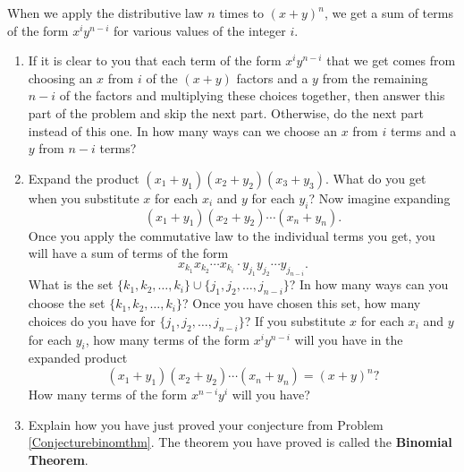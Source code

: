 \iteme  When we apply the distributive law $n$ times to $(x+y)^n$, we get a
sum of terms of the form $x^iy^{n-i}$ for various values of the integer $i$.  
\begin{enumerate}
\item If it is clear to you that each term of the form $x^iy^{n-i}$ that we
get comes from choosing an $x$ from $i$ of the $(x+y)$ factors and a $y$ from
the remaining
$n-i$ of the factors and multiplying these choices together, then answer this
part of the problem and skip the next part.  Otherwise, do the next part
instead of this one.  In how many ways can we choose an $x$ from $i$ terms
and a $y$ from
$n-i$ terms?
\item  Expand the product $(x_1 +y_1)(x_2 +y_2)(x_3+y_3)$.  What do you get
when you substitute $x$ for each $x_i$ and $y$ for each $y_i$?  Now imagine
expanding $$(x_1+y_1)(x_2+y_2)\cdots (x_n+y_n).$$  Once you apply the
commutative law to the individual terms you get, you will have a sum of terms
of the form $$x_{k_1}x_{k_2}\cdots x_{k_i}\cdot y_{j_1}y_{j_2}\cdots
y_{j_{n-i}}.$$
What is the set $\{k_1,k_2,\ldots, k_i\}\cup \{j_1,j_2,\ldots, j_{n-i}\}$?  In
how many ways can you choose the set  $\{k_1,k_2,\ldots, k_i\}$?  Once you
have chosen this set, how many choices do you have for $\{j_1,j_2,\ldots,
j_{n-i}\}$?  If you substitute $x$ for each $x_i$ and $y$ for each $y_i$, how
many terms of the form $x^iy^{n-i}$ will you have in the expanded product
$$(x_1+y_1)(x_2+y_2)\cdots (x_n+y_n)=(x+y)^n?$$  How many terms of the form
$x^{n-i}y^i$ will you have?
\item Explain how you have just proved your conjecture from Problem
\ref{Conjecturebinomthm}.  The theorem you have proved is called the
{\bf Binomial Theorem}.
\end{enumerate}
